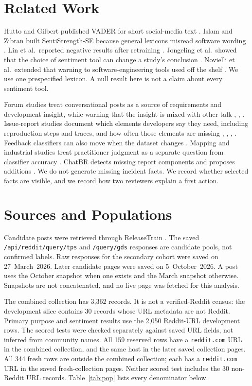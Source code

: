 \documentclass[conference,letterpaper]{IEEEtran}
\begin{document}
\section{Related Work}
Hutto and Gilbert published VADER for short social-media text \cite{Hutto2014VADER}. Islam and Zibran built SentiStrength-SE because general lexicons misread software wording \cite{Islam2018SentiStrengthSE}. Lin et al.\ reported negative results after retraining \cite{Lin2018HowFar}. Jongeling et al.\ showed that the choice of sentiment tool can change a study's conclusion \cite{Jongeling2017Negative}. Novielli et al.\ extended that warning to software-engineering tools used off the shelf \cite{Novielli2021Replication}. We use one prespecified lexicon. A null result here is not a claim about every sentiment tool.

Forum studies treat conversational posts as a source of requirements and development insight, while warning that the insight is mixed with other talk \cite{Tizard2019Forums}, \cite{Wang2024Forums}, \cite{Iqbal2021Reddit}. Issue-report studies document which elements developers say they need, including reproduction steps and traces, and how often those elements are missing \cite{Bettenburg2008GoodReport}, \cite{Chaparro2017Missing}, \cite{Soltani2020Elements}, \cite{Wang2025InformationNeeds}. Feedback classifiers can also move when the dataset changes \cite{Devine2023Transfer}. Mapping and industrial studies treat practitioner judgment as a separate question from classifier accuracy \cite{Laiq2026Mapping}. ChatBR detects missing report components and proposes additions \cite{Bo2024ChatBR}. We do not generate missing incident facts. We record whether selected facts are visible, and we record how two reviewers explain a first action.

\section{Sources and Populations}
Candidate posts were retrieved through \mbox{ReleaseTrain} \cite{ReleaseTrainDocs}. The saved \texttt{/api/reddit/query/tps} and \texttt{/query/gds} responses are candidate pools, not confirmed labels. Raw responses for the secondary cohort were saved on 27~March~2026. Later candidate pages were saved on 5~October~2026. A post uses the October snapshot when one exists and the March snapshot otherwise. Snapshots are not concatenated, and no live page was fetched for this analysis.

The combined collection has 3,362 records. It is not a verified-Reddit census: the development slice contains 30 records whose URL metadata are not Reddit. Primary purpose and sentiment results use the 2,050 Reddit-URL development rows. The scored tests were checked separately against saved URL fields, not inferred from community names. All 159 reserved rows have a \texttt{reddit.com} URL in the combined collection, and the same host in the later saved collection pages. All 344 fresh rows are outside the combined collection; each has a \texttt{reddit.com} URL in the saved fresh-collection pages. Neither scored test includes the 30 non-Reddit URL records. Table~\ref{tab:pop} lists every denominator below.
\end{document}
